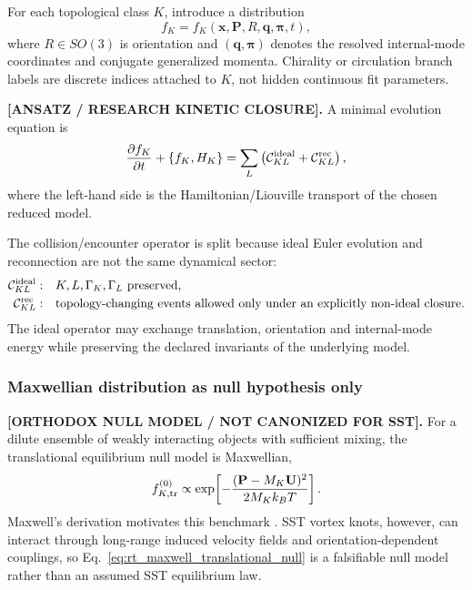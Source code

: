 For each topological class $K$, introduce a distribution
\begin{equation}
    f_K
    =
    f_K(
        \mathbf x,
        \mathbf P,
        R,
        \mathbf q,
        \boldsymbol\pi,
        t
    ),
    \label{eq:rt_maxwell_knot_distribution}
\end{equation}
where $R\in SO(3)$ is orientation and $(\mathbf q,\boldsymbol\pi)$ denotes the
resolved internal-mode coordinates and conjugate generalized momenta.  Chirality
or circulation branch labels are discrete indices attached to $K$, not hidden
continuous fit parameters.

\textbf{[ANSATZ / RESEARCH KINETIC CLOSURE].}
A minimal evolution equation is
\begin{equation}
    \frac{\partial f_K}{\partial t}
    +
    \{f_K,H_K\}
    =
    \sum_L
    \left(
        \mathcal C_{KL}^{\rm ideal}
        +
        \mathcal C_{KL}^{\rm rec}
    \right),
    \label{eq:rt_maxwell_sst_boltzmann}
\end{equation}
where the left-hand side is the Hamiltonian/Liouville transport of the chosen
reduced model.

The collision/encounter operator is split because ideal Euler evolution and
reconnection are not the same dynamical sector:
\begin{align}
    \mathcal C_{KL}^{\rm ideal}:
    &\quad
    K,L,\Gamma_K,\Gamma_L
    \ \text{preserved},
    \label{eq:rt_maxwell_ideal_collision_sector}\\
    \mathcal C_{KL}^{\rm rec}:
    &\quad
    \text{topology-changing events allowed only under an explicitly non-ideal
    closure}.
    \label{eq:rt_maxwell_reconnection_collision_sector}
\end{align}
The ideal operator may exchange translation, orientation and internal-mode
energy while preserving the declared invariants of the underlying model.

\subsubsection{Maxwellian distribution as null hypothesis only}

\textbf{[ORTHODOX NULL MODEL / NOT CANONIZED FOR SST].}
For a dilute ensemble of weakly interacting objects with sufficient mixing, the
translational equilibrium null model is Maxwellian,
\begin{equation}
    f_{K,\rm tr}^{(0)}
    \propto
    \exp\!\left[
        -\frac{
        (\mathbf P-M_K\mathbf U)^2
        }{2M_Kk_BT}
    \right].
    \label{eq:rt_maxwell_translational_null}
\end{equation}
Maxwell's derivation motivates this benchmark
\cite{Maxwell1860GasesI}.  SST vortex knots, however, can interact through
long-range induced velocity fields and orientation-dependent couplings, so
Eq.~\eqref{eq:rt_maxwell_translational_null} is a falsifiable null model rather
than an assumed SST equilibrium law.

